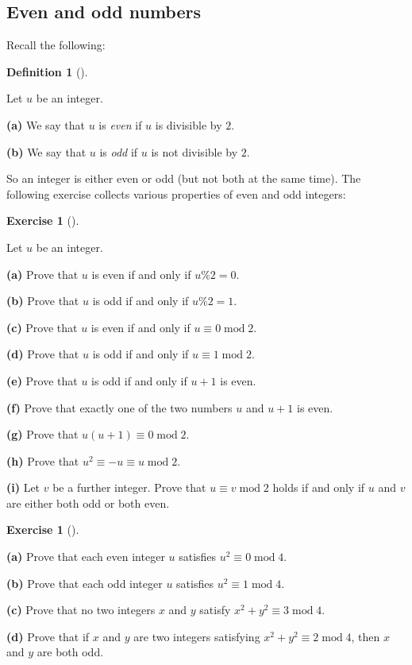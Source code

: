 \documentclass[numbers=enddot,12pt,final,onecolumn,notitlepage]{scrartcl}%
\newcounter{exer}
\numberwithin{exer}{subsection}
\theoremstyle{definition}
\newtheorem{defi}[theo]{Definition}
\newenvironment{definition}[1][]
{\begin{defi}[#1]\begin{leftbar}}
{\end{leftbar}\end{defi}}
\newtheorem{exmp}[exer]{Exercise}
\newenvironment{exercise}[1][]
{\begin{exmp}[#1]\begin{leftbar}}
{\end{leftbar}\end{exmp}}
\begin{document}
\subsection{Even and odd numbers}

Recall the following:

\begin{definition}
\label{def.ent.even-odd}Let $u$ be an integer.

\textbf{(a)} We say that $u$ is \textit{even} if $u$ is divisible by $2$.

\textbf{(b)} We say that $u$ is \textit{odd }if $u$ is not divisible by $2$.
\end{definition}

So an integer is either even or odd (but not both at the same time). The
following exercise collects various properties of even and odd integers:

\begin{exercise}
\label{exe.ent.even-odd.1}Let $u$ be an integer.

\textbf{(a)} Prove that $u$ is even if and only if $u\%2=0$.

\textbf{(b)} Prove that $u$ is odd if and only if $u\%2=1$.

\textbf{(c)} Prove that $u$ is even if and only if $u\equiv0\operatorname{mod}%
2$.

\textbf{(d)} Prove that $u$ is odd if and only if $u\equiv1\operatorname{mod}%
2$.

\textbf{(e)} Prove that $u$ is odd if and only if $u+1$ is even.

\textbf{(f)} Prove that exactly one of the two numbers $u$ and $u+1$ is even.

\textbf{(g)} Prove that $u\left(  u+1\right)  \equiv0\operatorname{mod}2$.

\textbf{(h)} Prove that $u^{2}\equiv-u\equiv u\operatorname{mod}2$.

\textbf{(i)} Let $v$ be a further integer. Prove that $u\equiv
v\operatorname{mod}2$ holds if and only if $u$ and $v$ are either both odd or
both even.
\end{exercise}

\begin{exercise}
\label{exe.ent.even-odd-sumsq}\textbf{(a)} Prove that each even integer $u$
satisfies $u^{2}\equiv0\operatorname{mod}4$.

\textbf{(b)} Prove that each odd integer $u$ satisfies $u^{2}\equiv
1\operatorname{mod}4$.

\textbf{(c)} Prove that no two integers $x$ and $y$ satisfy $x^{2}+y^{2}%
\equiv3\operatorname{mod}4$.

\textbf{(d)} Prove that if $x$ and $y$ are two integers satisfying
$x^{2}+y^{2}\equiv2\operatorname{mod}4$, then $x$ and $y$ are both odd.
\end{exercise}
\end{document}
